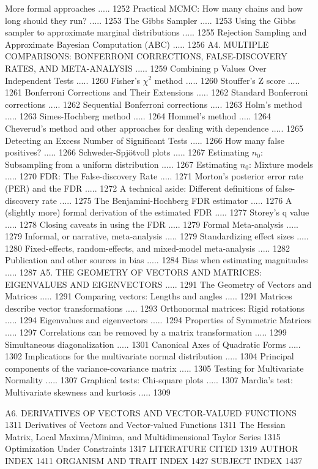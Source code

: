 \documentclass{article}
\begin{document}
More formal approaches ..... 1252
Practical MCMC: How many chains and how long should they run? ..... 1253
The Gibbs Sampler ..... 1253
Using the Gibbs sampler to approximate marginal distributions ..... 1255
Rejection Sampling and Approximate Bayesian Computation (ABC) ..... 1256
A4. MULTIPLE COMPARISONS: BONFERRONI CORRECTIONS, FALSE-DISCOVERY RATES, AND META-ANALYSIS ..... 1259
Combining p Values Over Independent Tests ..... 1260
Fisher's  $ \chi^{2} $ method ..... 1260
Stouffer's Z score ..... 1261
Bonferroni Corrections and Their Extensions ..... 1262
Standard Bonferroni corrections ..... 1262
Sequential Bonferroni corrections ..... 1263
Holm's method ..... 1263
Simes-Hochberg method ..... 1264
Hommel's method ..... 1264
Cheverud's method and other approaches for dealing with dependence ..... 1265
Detecting an Excess Number of Significant Tests ..... 1266
How many false positives? ..... 1266
Schweder-Spjötvoll plots ..... 1267
Estimating  $ n_{0} $: Subsampling from a uniform distribution ..... 1267
Estimating  $ n_{0} $: Mixture models ..... 1270
FDR: The False-discovery Rate ..... 1271
Morton's posterior error rate (PER) and the FDR ..... 1272
A technical aside: Different definitions of false-discovery rate ..... 1275
The Benjamini-Hochberg FDR estimator ..... 1276
A (slightly more) formal derivation of the estimated FDR ..... 1277
Storey's q value ..... 1278
Closing caveats in using the FDR ..... 1279
Formal Meta-analysis ..... 1279
Informal, or narrative, meta-analysis ..... 1279
Standardizing effect sizes ..... 1280
Fixed-effects, random-effects, and mixed-model meta-analysis ..... 1282
Publication and other sources in bias ..... 1284
Bias when estimating magnitudes ..... 1287
A5. THE GEOMETRY OF VECTORS AND MATRICES: EIGENVALUES AND EIGENVECTORS ..... 1291
The Geometry of Vectors and Matrices ..... 1291
Comparing vectors: Lengths and angles ..... 1291
Matrices describe vector transformations ..... 1293
Orthonormal matrices: Rigid rotations ..... 1294
Eigenvalues and eigenvectors ..... 1294
Properties of Symmetric Matrices ..... 1297
Correlations can be removed by a matrix transformation ..... 1299
Simultaneous diagonalization ..... 1301
Canonical Axes of Quadratic Forms ..... 1302
Implications for the multivariate normal distribution ..... 1304
Principal components of the variance-covariance matrix ..... 1305
Testing for Multivariate Normality ..... 1307
Graphical tests: Chi-square plots ..... 1307
Mardia's test: Multivariate skewness and kurtosis ..... 1309

A6. DERIVATIVES OF VECTORS AND VECTOR-VALUED FUNCTIONS 1311
Derivatives of Vectors and Vector-valued Functions 1311
The Hessian Matrix, Local Maxima/Minima, and Multidimensional Taylor Series 1315
Optimization Under Constraints 1317
LITERATURE CITED 1319
AUTHOR INDEX 1411
ORGANISM AND TRAIT INDEX 1427
SUBJECT INDEX 1437
\end{document}
